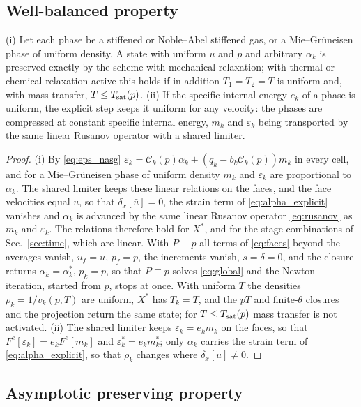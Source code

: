 \subsection{Well-balanced property}
\label{sec:wb}
\begin{proposition}\label{prop:wb}
(i) Let each phase be a stiffened or Noble--Abel stiffened gas, or a Mie--Gr\"uneisen phase of uniform density. A state
with uniform $u$ and $p$ and arbitrary $\alpha_k$ is preserved exactly by the scheme with mechanical relaxation; with thermal
or chemical relaxation active this holds if in addition $T_1=T_2=T$ is uniform and, with mass transfer, $T\le T_{\rm sat}(p)$.
(ii) If the specific internal energy $e_k$ of a phase is uniform, the explicit step keeps it uniform for any velocity: the
phases are compressed at constant specific internal energy, $m_k$ and $\varepsilon_k$ being transported by the same linear Rusanov operator with a shared limiter.
\end{proposition}
\begin{proof}
(i) By \eqref{eq:eps_nasg} $\varepsilon_k=\mathcal C_k(p)\alpha_k+(q_k-b_k\mathcal C_k(p))m_k$ in every cell, and for a Mie--Gr\"uneisen phase of
uniform density $m_k$ and $\varepsilon_k$ are proportional to $\alpha_k$. The shared limiter keeps these linear relations
on the faces, and the face velocities equal $u$, so that $\delta_x[\bar u]=0$, the strain term of \eqref{eq:alpha_explicit} vanishes and $\alpha_k$
is advanced by the same linear Rusanov operator \eqref{eq:rusanov} as $m_k$ and $\varepsilon_k$. The relations therefore hold for $X^*$,
and for the stage combinations of Sec.~\ref{sec:time}, which are linear. With $P\equiv p$ all terms of \eqref{eq:faces} beyond the averages
vanish, $u_f=u$, $p_f=p$, the increments vanish, $s=\delta=0$, and the closure returns $\alpha_k=\alpha^*_k$, $p_k=p$, so that $P\equiv p$ solves
\eqref{eq:global} and the Newton iteration, started from $p$, stops at once. With uniform $T$ the densities $\rho_k=1/v_k(p,T)$
are uniform, $X^*$ has $T_k=T$, and the $pT$ and finite-$\theta$ closures and the projection return the same state; for
$T\le T_{\rm sat}(p)$ mass transfer is not activated. (ii) The shared limiter keeps $\varepsilon_k=e_km_k$ on the faces, so that
$F^e[\varepsilon_k]=e_kF^e[m_k]$ and $\varepsilon^*_k=e_km^*_k$; only $\alpha_k$ carries the strain term of \eqref{eq:alpha_explicit}, so that $\rho_k$
changes where $\delta_x[\bar u]\ne0$.
\end{proof}

\subsection{Asymptotic preserving property}
\label{sec:ap}
